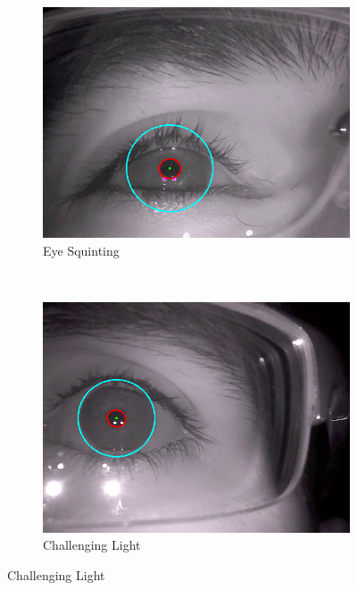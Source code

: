 \begin{figure}[t]
	\centering
	
	\begin{subfigure}[b]{0.5\textwidth}
		\centering
		\includegraphics[width=\textwidth]{Handin1/images/good1.png}
		\caption{Eye Squinting}
		\label{subfig:squinting}
	\end{subfigure}%
	~
	\begin{subfigure}[b]{0.5\textwidth}
		\centering
		\includegraphics[width=\textwidth]{Handin1/images/good2.png}
		\caption{Challenging Light}
		\label{subfig:challenging_light}
	\end{subfigure}
	

\end{figure}
